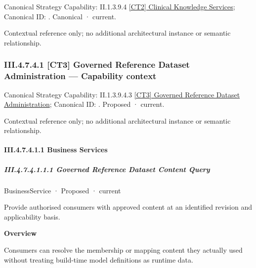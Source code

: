 {\small Canonical Strategy Capability: II.1.3.9.4 \hyperref[element:bbd2bd21859f40e39963bdbe7a851686]{[CT2] Clinical Knowledge Services}; Canonical ID: \texttt{}. Canonical · current.}\par
Contextual reference only; no additional architectural instance or semantic relationship.\par
\subsubsection*{III.4.7.4.1 [CT3] Governed Reference Dataset Administration — Capability context}
\label{navigation:III.4.7.4.1}

{\small Canonical Strategy Capability: II.1.3.9.4.3 \hyperref[element:682b8684ad9e49d5a5c348a148081607]{[CT3] Governed Reference Dataset Administration}; Canonical ID: \texttt{}. Proposed · current.}\par
Contextual reference only; no additional architectural instance or semantic relationship.\par
\paragraph*{III.4.7.4.1.1 Business Services}
\label{navigation:III.4.7.4.1.1}

\subparagraph*{III.4.7.4.1.1.1 Governed Reference Dataset Content Query}
\label{navigation:III.4.7.4.1.1.1}

\label{element:625ef1036a7442b2b8aed06f72b8afff}
{\small BusinessService · Proposed · current}\par

Provide authorised consumers with approved content at an identified revision and applicability basis.



\textbf{Overview}



Consumers can resolve the membership or mapping content they actually used without treating build-time model definitions as runtime data.



